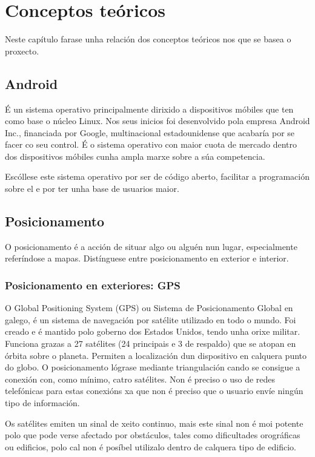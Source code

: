 \chapter{Conceptos teóricos}

Neste capítulo farase unha relación dos conceptos teóricos nos que se basea o proxecto.


\section{Android}

É un sistema operativo principalmente dirixido a dispositivos móbiles que ten como base o núcleo Linux. Nos seus inicios foi desenvolvido pola empresa Android Inc., financiada por Google, multinacional estadounidense que acabaría por se facer co seu control. É o sistema operativo con maior cuota de mercado dentro dos dispositivos móbiles cunha ampla marxe sobre a súa competencia.

Escóllese este sistema operativo por ser de código aberto, facilitar a programación sobre el e por ter unha base de usuarios maior.

\section{Posicionamento}
O posicionamento é a acción de situar algo ou alguén nun lugar, especialmente referíndose a mapas. Distínguese entre posicionamento en exterior e interior.

\subsection{Posicionamento en exteriores: GPS}

O Global Positioning System (GPS) ou Sistema de Posicionamento Global en galego, é un sistema de navegación por satélite utilizado en todo o mundo. Foi creado e é mantido polo goberno dos Estados Unidos, tendo unha orixe militar. Funciona grazas a 27 satélites (24 principais e 3 de respaldo) que se atopan en órbita sobre o planeta. Permiten a localización dun dispositivo en calquera punto do globo. O posicionamento lógrase mediante triangulación cando se consigue a conexión con, como mínimo, catro satélites. Non é preciso o uso de redes telefónicas para estas conexións xa que non é preciso que o usuario envíe ningún tipo de información.

Os satélites emiten un sinal de xeito continuo, mais este sinal non é moi potente polo que pode verse afectado por obstáculos, tales como dificultades orográficas ou edificios, polo cal non é posíbel utilizalo dentro de calquera tipo de edificio.


